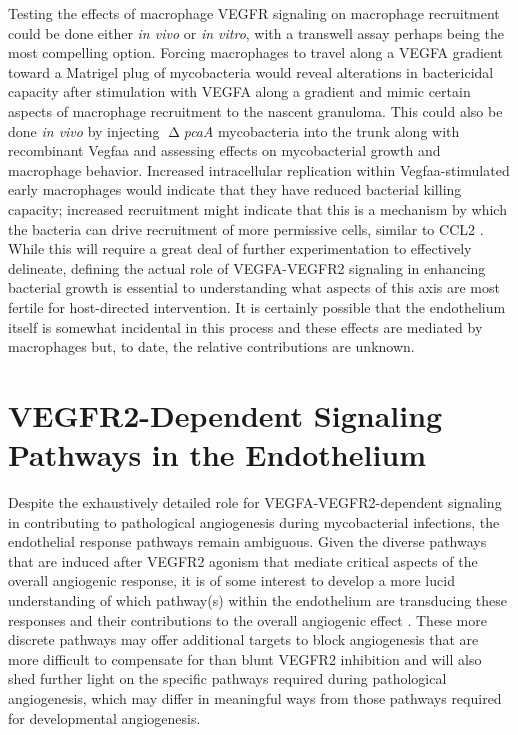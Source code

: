 Testing the effects of macrophage VEGFR signaling on macrophage recruitment could be done either \textit{in vivo} or \textit{in vitro}, with a transwell assay perhaps being the most compelling option. Forcing macrophages to travel along a VEGFA gradient toward a Matrigel plug of mycobacteria would reveal alterations in bactericidal capacity after stimulation with VEGFA along a gradient and mimic certain aspects of macrophage recruitment to the nascent granuloma. This could also be done \textit{in vivo} by injecting $\upDelta$\textit{pcaA} mycobacteria into the trunk along with recombinant Vegfaa and assessing effects on mycobacterial growth and macrophage behavior. Increased intracellular replication within Vegfaa\hyp{}stimulated early macrophages would indicate that they have reduced bacterial killing capacity; increased recruitment might indicate that this is a mechanism by which the bacteria can drive recruitment of more permissive cells, similar to CCL2 \citep{Cambier2014b, Cattin2015}. While this will require a great deal of further experimentation to effectively delineate, defining the actual role of VEGFA\hyp{}VEGFR2 signaling in enhancing bacterial growth is essential to understanding what aspects of this axis are most fertile for host\hyp{}directed intervention. It is certainly possible that the endothelium itself is somewhat incidental in this process and these effects are mediated by macrophages but, to date, the relative contributions are unknown. 

\section{VEGFR2\hyp{}Dependent Signaling Pathways in the Endothelium}

Despite the exhaustively detailed role for VEGFA\hyp{}VEGFR2\hyp{}dependent signaling in contributing to pathological angiogenesis during mycobacterial infections, the endothelial response pathways remain ambiguous. Given the diverse pathways that are induced after VEGFR2 agonism that mediate critical aspects of the overall angiogenic response, it is of some interest to develop a more lucid understanding of which pathway(s) within the endothelium are transducing these responses and their contributions to the overall angiogenic effect \citep{Abhinand2016}. These more discrete pathways may offer additional targets to block angiogenesis that are more difficult to compensate for than blunt VEGFR2 inhibition and will also shed further light on the specific pathways required during pathological angiogenesis, which may differ in meaningful ways from those pathways required for developmental angiogenesis.

